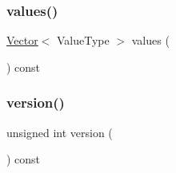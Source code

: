 \mbox{\label{classHashMap_a50ccbe4184324f0da975648a12728d20}} 
\subsubsection{\texorpdfstring{values()}{values()}}
{\footnotesize\ttfamily \mbox{\hyperlink{classVector}{Vector}}$<$ Value\+Type $>$ values (\begin{DoxyParamCaption}{ }\end{DoxyParamCaption}) const}

\mbox{\label{classHashMap_a0aa696ccb72cbf928535d6b646bac1aa}} 
\subsubsection{\texorpdfstring{version()}{version()}}
{\footnotesize\ttfamily unsigned int version (\begin{DoxyParamCaption}{ }\end{DoxyParamCaption}) const\hspace{0.3cm}{\ttfamily [inline]}}

